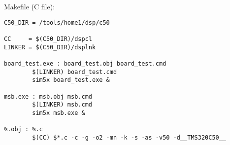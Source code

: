 Makefile (C file):
\begin{verbatim}
C50_DIR = /tools/home1/dsp/c50

CC     = $(C50_DIR)/dspcl
LINKER = $(C50_DIR)/dsplnk

board_test.exe : board_test.obj board_test.cmd
        $(LINKER) board_test.cmd
        sim5x board_test.exe &

msb.exe : msb.obj msb.cmd
        $(LINKER) msb.cmd
        sim5x msb.exe &

%.obj : %.c
        $(CC) $*.c -c -g -o2 -mn -k -s -as -v50 -d__TMS320C50__ 
\end{verbatim}
